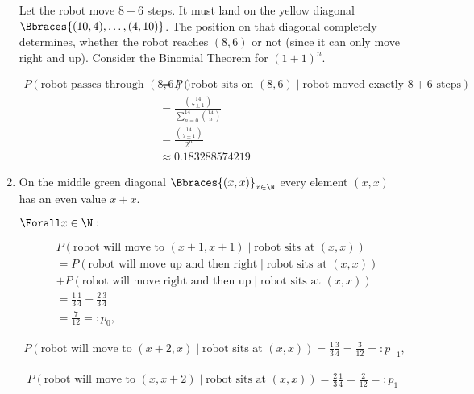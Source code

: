 \begin{solution}
\begin{enumerate}[label = (\alph*)]
    Let the robot move $8 + 6$ steps.
    It must land on the yellow diagonal $\Bbraces{(10, 4), \dots, (4, 10)}$.
    The position on that diagonal completely determines, whether the robot reaches $(8, 6)$ or not (since it can only move right and up).
    Consider the Binomial Theorem for $(1 + 1)^n$.
    
    \begin{align*}
        P(\text{robot passes through $(8, 6)$})
        & =
        P(\text{robot sits on $(8, 6)$} \mid \text{robot moved exactly $8 + 6$ steps}) \\
        & =
        \frac
        {
            \binom{14}{7 \pm 1}
        }{
            \sum_{n=0}^{14}
                \binom{14}{n}
        } \\
        & =
        \frac{\binom{14}{7 \pm 1}}{2^n} \\
        & \approx
        0.183288574219
    \end{align*}

    \item On the middle green diagonal $\Bbraces{(x, x)}_{x \in \N}$ every element $(x, x)$ has an even value $x + x$.

    $\Forall x \in \N:$

    \begin{align*}
        &
        P(\text{robot will move to $(x+1, x+1)$} \mid \text{robot sits at $(x, x)$}) \\
        & =
        P(\text{robot will move up and then right} \mid \text{robot sits at $(x, x)$}) \\
        & +
        P(\text{robot will move right and then up} \mid \text{robot sits at $(x, x)$}) \\
        & =
        \frac{1}{3} \frac{1}{4} + \frac{2}{3} \frac{3}{4} \\
        & =
        \frac{7}{12} =: p_0,
    \end{align*}

    \begin{align*}
        P(\text{robot will move to $(x+2, x)$} \mid \text{robot sits at $(x, x)$})
        =
        \frac{1}{3} \frac{3}{4}
        =
        \frac{3}{12} =: p_{-1},
    \end{align*}

    \begin{align*}
        P(\text{robot will move to $(x, x+2)$} \mid \text{robot sits at $(x, x)$})
        =
        \frac{2}{3} \frac{1}{4}
        =
        \frac{2}{12} =: p_1
    \end{align*}


\end{enumerate}
\end{solution}
